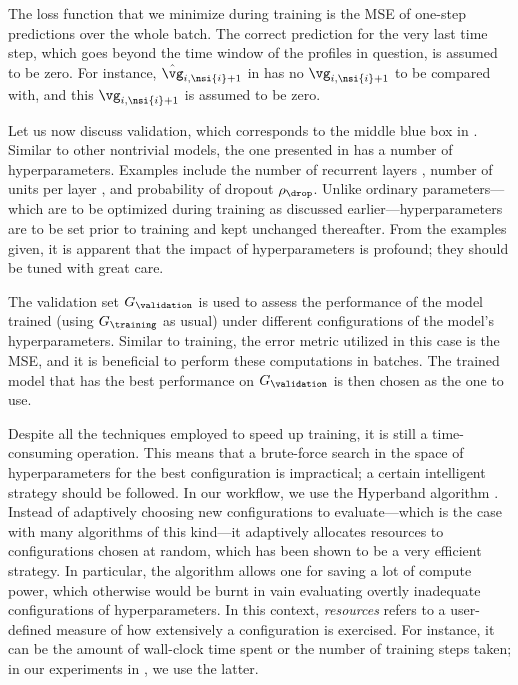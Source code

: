The loss function that we minimize during training is the \ac{MSE} of one-step
predictions over the whole batch. The correct prediction for the very last time
step, which goes beyond the time window of the profiles in question, is assumed
to be zero. For instance, $\hat{\vg}_{i, \nsi{i} + 1}$ in
 has no $\vg_{i, \nsi{i} + 1}$ to be compared with,
and this $\vg_{i, \nsi{i} + 1}$ is assumed to be zero.

Let us now discuss validation, which corresponds to the middle blue box in
. Similar to other nontrivial models, the one presented in
 has a number of hyperparameters. Examples include
the number of recurrent layers \nl, number of units per layer \nu, and
probability of dropout $\rho_\drop$. Unlike ordinary parameters---which are to
be optimized during training as discussed earlier---hyperparameters are to be
set prior to training and kept unchanged thereafter. From the examples given, it
is apparent that the impact of hyperparameters is profound; they should be tuned
with great care.

The validation set $G_\validation$ is used to assess the performance of the
model trained (using $G_\training$ as usual) under different configurations of
the model's hyperparameters. Similar to training, the error metric utilized in
this case is the \ac{MSE}, and it is beneficial to perform these computations in
batches. The trained model that has the best performance on $G_\validation$ is
then chosen as the one to use.

Despite all the techniques employed to speed up training, it is still a
time-consuming operation. This means that a brute-force search in the space of
hyperparameters for the best configuration is impractical; a certain intelligent
strategy should be followed. In our workflow, we use the Hyperband algorithm
\cite{li2016}. Instead of adaptively choosing new configurations to
evaluate---which is the case with many algorithms of this kind---it adaptively
allocates resources to configurations chosen at random, which has been shown to
be a very efficient strategy. In particular, the algorithm allows one for saving
a lot of compute power, which otherwise would be burnt in vain evaluating
overtly inadequate configurations of hyperparameters. In this context,
\emph{resources} refers to a user-defined measure of how extensively a
configuration is exercised. For instance, it can be the amount of wall-clock
time spent or the number of training steps taken; in our experiments in
, we use the latter.

